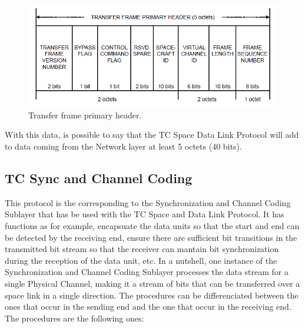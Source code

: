 \begin{figure}[H]
\begin{center}
\includegraphics[scale=1]{transferframeprimaryheader.PNG}   
\caption{Transfer frame primary header.}
\end{center}
\end{figure}

With this data, is possible to say that the TC Space Data Link Protocol will add to data coming from the Network layer at least 5 octets (40 bits).

\subsection{TC Sync and Channel Coding}
This protocol is the corresponding to the Synchronization and Channel Coding Sublayer that has be used with the TC Space and Data Link Protocol. It has functions as for example, encapsuate the data units so that the start and end can be detected by the receiving end, ensure there are sufficient bit transitions in the transmitted bit stream so that the receiver can mantain bit synchronization during the reception of the data unit, etc. In a nutshell, one instance of the Synchronization and Channel Coding Sublayer processes the data stream for a single Physical Channel, making it a stream of bits that can be transferred over a space link in a single direction. The procedures can be differenciated between the ones that occur in the sending end and the one that occur in the receiving end. The procedures are the following ones:

